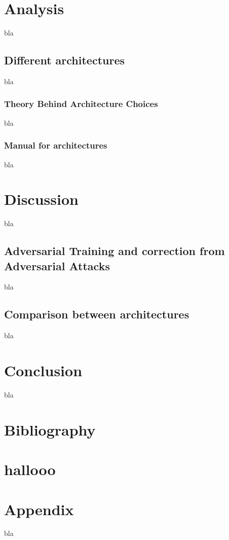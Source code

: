 \documentclass[a4paper,11pt]{article}
\begin{document}
\section{Analysis}
bla
\subsection{Different architectures}
bla
\subsubsection{Theory Behind Architecture Choices}
bla
\subsubsection{Manual for architectures}
bla
\section{Discussion}
bla
\subsection{Adversarial Training and correction from Adversarial Attacks}
bla
\subsection{Comparison between architectures}
bla
\section{Conclusion}
bla
\section{Bibliography}


\section{hallooo}

\section{Appendix}
bla
\end{document}
